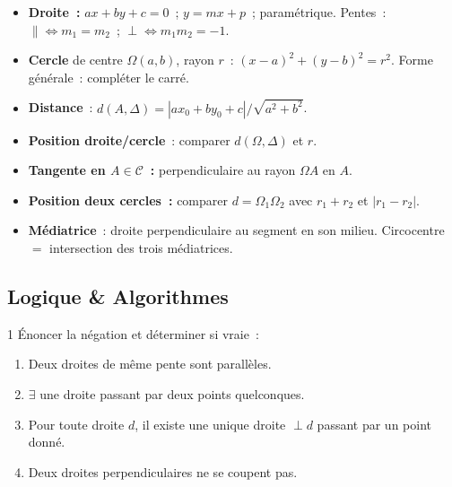 \begin{bilan}
\begin{itemize}
  \item \textbf{Droite~:} $ax+by+c=0$~; $y=mx+p$~; param\'etrique.
        Pentes~: $\parallel \Leftrightarrow m_1=m_2$~;
        $\perp \Leftrightarrow m_1m_2=-1$.
  \item \textbf{Cercle} de centre $\Omega(a,b)$, rayon $r$~:
        $(x-a)^2+(y-b)^2=r^2$.
        Forme g\'en\'erale~: compl\'eter le carr\'e.
  \item \textbf{Distance}~: $d(A,\Delta)=|ax_0+by_0+c|/\sqrt{a^2+b^2}$.
  \item \textbf{Position droite/cercle}~: comparer $d(\Omega,\Delta)$ et $r$.
  \item \textbf{Tangente en $A\in\mathcal{C}$~:}
        perpendiculaire au rayon $\Omega A$ en $A$.
  \item \textbf{Position deux cercles~:}
        comparer $d=\Omega_1\Omega_2$ avec $r_1+r_2$ et $|r_1-r_2|$.
  \item \textbf{M\'ediatrice}~: droite perpendiculaire au segment en son milieu.
        Circocentre $=$ intersection des trois m\'ediatrices.
\end{itemize}
\end{bilan}

\subsection*{Logique \& Algorithmes}

\begin{exo}{1}
\'Enoncer la n\'egation et d\'eterminer si vraie~:
\begin{enumerate}
  \item \og Deux droites de m\^eme pente sont parall\`eles.\fg
  \item \og $\exists$ une droite passant par deux points quelconques.\fg
  \item \og Pour toute droite $d$, il existe une unique droite $\perp d$
        passant par un point donn\'e.\fg
  \item \og Deux droites perpendiculaires ne se coupent pas.\fg
\end{enumerate}
\end{exo}

